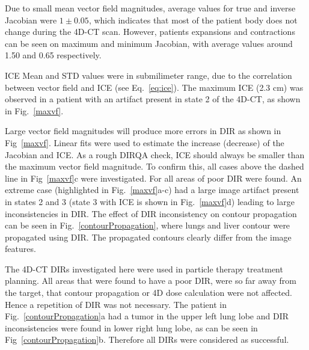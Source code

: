 Due to small mean vector field magnitudes, average values for true and inverse Jacobian were $1\pm0.05$, which indicates that most of the patient body does not change during the 4D-CT
scan. However, patients expansions and contractions can be seen on maximum and minimum Jacobian, with average values around 1.50 and 0.65 respectively. 

ICE Mean and STD values were in submilimeter range, due to the correlation between vector field and ICE (see Eq.~\ref{eq:ice}). The maximum ICE (2.3 cm) was observed in a patient with 
an artifact present in state 2 of the 4D-CT, as shown in Fig.~\ref{maxvf}.

Large vector field magnitudes will produce more errors in DIR as shown in Fig~\ref{maxvf}. Linear fits were used to estimate the increase (decrease) of the Jacobian and ICE. 
As a rough DIRQA check, ICE should always be smaller than the maximum vector field magnitude. To confirm this, all cases above the dashed line in Fig~\ref{maxvf}c 
were investigated. For all areas of poor DIR were found. An extreme case (highlighted in Fig.~\ref{maxvf}a-c)
had a large image artifact present in states 2 and 3 (state 3 with ICE is shown in Fig.~\ref{maxvf}d) leading to large inconsistencies in DIR. 
The effect of DIR inconsistency on contour propagation can be seen in Fig.~\ref{contourPropagation},
where lungs and liver contour were propagated using DIR. The propagated contours clearly differ from the image features.

The 4D-CT DIRs investigated here were used in particle therapy treatment planning. All areas that were found to have a poor DIR, were so far away from the target, that contour propagation or 4D dose calculation were not affected.
Hence a repetition of DIR was not necessary.
The patient in Fig.~\ref{contourPropagation}a had a tumor in the upper left lung lobe and DIR inconsistencies were found in lower right lung lobe, as can be seen in Fig~\ref{contourPropagation}b. 
Therefore all DIRs were considered as successful. 

